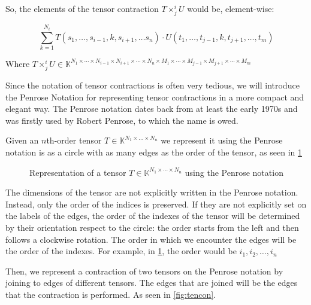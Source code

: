 \documentclass[11pt,a4paper,openright,oneside]{book}
\numberwithin{equation}{section}
\newcommand{\figref}[1]{\cref{#1}}
\begin{document}
So, the elements of the tensor contraction $T \times^i_j U$ would be, element-wise:

$$\sum_{k = 1}^{N_i} T(s_1, \dots, s_{i-1}, k, s_{i+1}, \dots s_n) \cdot U(t_1, \dots, t_{j-1}, k, t_{j+1}, \dots, t_m) $$

Where $T \times^i_j U \in \mathbb{K}^{N_1 \times \cdots \times N_{i-1} \times N_{i+1} \times \cdots \times N_n \times M_1 \times \cdots \times 
M_{j-1} \times M_{j+1} \times \cdots \times M_m}$

Since the notation of tensor contractions is often very tedious, we will introduce the Penrose Notation for representing tensor contractions in a
more compact and elegant way. The Penrose notation dates back from at least the early 1970s and was
firstly used by Robert Penrose, to which the name is owed. \cite{rogerPenroseApplications}

Given an $n$th-order tensor $T \in \mathbb{K}^{N_1 \times \dots \times N_n}$ we represent it using the
Penrose notation is as a circle with as many edges as the order of the tensor, as seen in \figref{fig:tens}

\begin{figure}[h]
\centering
{}
\caption{
    Representation of a tensor $T \in \mathbb{K}^{N_1 \times \cdots \times N_n}$ using the Penrose notation
}
\label{fig:tens}
\end{figure}

The dimensions of the tensor are not explicitly written in the Penrose notation. Instead, only the order
of the indices is preserved. If they are not explicitly set on the labels of the edges,
the order of the indexes of the tensor will be determined by their orientation respect to the circle: 
the order starts from the left and then follows a clockwise rotation. The order in which we encounter the edges will be the order of the indexes. 
For example, in \figref{fig:tens}, the order would be $i_1, i_2, \dots, i_n$

Then, we represent a contraction of two tensors on the Penrose notation by joining to edges of different tensors. The edges that are
joined will be the edges that the contraction is performed. As seen in \figref{fig:tencon}.
\end{document}
